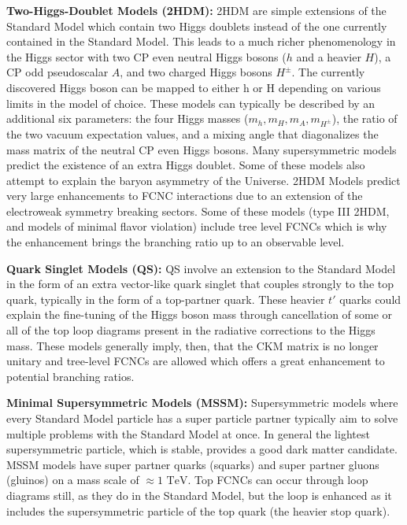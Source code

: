 \textbf{Two-Higgs-Doublet Models (2HDM): } 2HDM are simple extensions of the Standard Model which contain two Higgs doublets instead of the one currently contained in the Standard Model.  This leads to a much richer phenomenology in the Higgs sector with two CP even neutral Higgs bosons ($h$ and a heavier $H$), a CP odd pseudoscalar $A$, and two charged Higgs bosons $H^\pm$.  The currently discovered Higgs boson can be mapped to either h or H depending on various limits in the model of choice.  These models can typically be described by an additional six parameters: the four Higgs masses ($m_h, m_H,m_A,m_{H^\pm}$), the ratio of the two vacuum expectation values, and a mixing angle that diagonalizes the mass matrix of the neutral CP even Higgs bosons.  Many supersymmetric models predict the existence of an extra Higgs doublet.  Some of these models also attempt to explain the baryon asymmetry of the Universe\cite{Trodden:1998ym}.
2HDM Models predict very large enhancements to FCNC interactions due to an extension of the electroweak symmetry breaking sectors.  Some of these models (type III 2HDM, and models of minimal flavor violation) include tree level FCNCs\cite{Branco:2011iw} which is why the enhancement brings the branching ratio up to an observable level.

\textbf{Quark Singlet Models (QS): } QS involve an extension to the Standard Model in the form of an extra vector-like quark singlet that couples strongly to the top quark, typically in the form of a top-partner quark.  These heavier $t'$ quarks could explain the fine-tuning of the Higgs boson mass through cancellation of some or all of the top loop diagrams present in the radiative corrections to the Higgs mass.  These models generally imply, then, that the CKM matrix is no longer unitary and tree-level FCNCs are allowed which offers a great enhancement to potential branching ratios\cite{QS-1,QS-2}.

\textbf{Minimal Supersymmetric Models (MSSM): }  Supersymmetric models where every Standard Model particle has a super particle partner typically aim to solve multiple problems with the Standard Model at once.  In general the lightest supersymmetric particle, which is stable, provides a good dark matter candidate.  MSSM models have super partner quarks (squarks) and super partner gluons (gluinos) on a mass scale of $\approx 1 \text{ TeV}$.  Top FCNCs can occur through loop diagrams still, as they do in the Standard Model, but the loop is enhanced as it includes the supersymmetric particle of the top quark (the heavier stop quark)\cite{MSSM, MSSM-2}.

